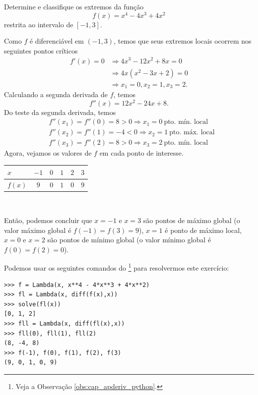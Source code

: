 \begin{exeresol}
  Determine e classifique os extremos da função
  \begin{equation}
    f(x) = x^4 - 4x^3 + 4x^2
  \end{equation}
  restrita ao intervalo de $[-1, 3]$.
\end{exeresol}
\begin{resol}
  Como $f$ é diferenciável em $(-1, 3)$, temos que seus extremos locais ocorrem nos seguintes pontos críticos
  \begin{align}
    f'(x) = 0 &\Rightarrow 4x^3-12x^2+8x = 0 \\
              &\Rightarrow 4x(x^2-3x+2)=0 \\
              &\Rightarrow x_1 = 0, x_2 = 1, x_3 = 2.
  \end{align}
  Calculando a segunda derivada de $f$, temos
  \begin{equation}
    f''(x) = 12x^2 - 24x + 8.
  \end{equation}
  Do teste da segunda derivada, temos
  \begin{align}
    & f''(x_1) = f''(0) = 8 > 0 \Rightarrow x_1=0 ~ \text{pto. mín. local} \\
    & f''(x_2) = f''(1) = -4 < 0 \Rightarrow x_2=1 ~ \text{pto. máx. local} \\
    & f''(x_3) = f''(2) = 8 > 0 \Rightarrow x_3=2 ~ \text{pto. mín. local} 
  \end{align}
  Agora, vejamos os valores de $f$ em cada ponto de interesse.
  \begin{center}
    \begin{tabular}{l|ccccc}
      $x$     & $-1$ & $0$ & $1$ & $2$ & $3$ \\\hline
      $f(x)$  & $9$    & $0$   & $1$   & $0$ & $9$ \\
    \end{tabular}\\
  \end{center}
  Então, podemos concluir que $x=-1$ e $x=3$ são pontos de máximo global (o valor máximo global é $f(-1)=f(3)=9$), $x=1$ é ponto de máximo local, $x=0$ e $x=2$ são pontos de mínimo global (o valor mínimo global é $f(0)=f(2)=0$).
  
  \ifispython
  Podemos usar os seguintes comandos do \sympy\footnote{Veja a Observação \ref{obs:cap_apderiv_python}.} para resolvermos este exercício:
\begin{verbatim}
>>> f = Lambda(x, x**4 - 4*x**3 + 4*x**2)
>>> fl = Lambda(x, diff(f(x),x))
>>> solve(fl(x))
[0, 1, 2]
>>> fll = Lambda(x, diff(fl(x),x))
>>> fll(0), fll(1), fll(2)
(8, -4, 8)
>>> f(-1), f(0), f(1), f(2), f(3)
(9, 0, 1, 0, 9)
\end{verbatim}
  \fi
\end{resol}

